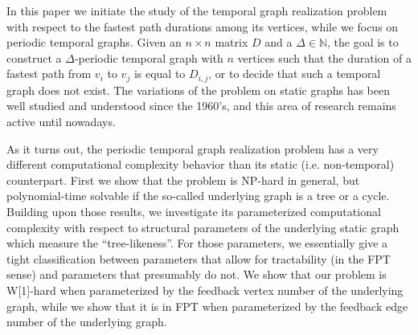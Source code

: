 In this paper we initiate the study of the temporal graph realization problem with respect to the fastest path durations among its vertices, while we focus on periodic temporal graphs. Given an $n \times n$ matrix $D$ and a $\Delta \in \mathbb{N}$, the goal is to construct a $\Delta$-periodic temporal graph with $n$ vertices such that the duration of a fastest path from $v_i$ to $v_j$ is equal to $D_{i,j}$, or to decide that such a temporal graph does not exist. The variations of the problem on static graphs has been well studied and understood since the 1960's, and this area of research remains active until nowadays. 

As it turns out, the periodic temporal graph realization problem has a very different computational complexity behavior than its static (i.e. non-temporal) counterpart. First we show that the problem is NP-hard in general, but polynomial-time solvable if the so-called underlying graph is a tree or a cycle. Building upon those results, we investigate its parameterized computational complexity with respect to structural parameters of the underlying static graph which measure the ``tree-likeness''. For those parameters, we essentially give a tight classification between parameters that allow for tractability (in the FPT sense) and parameters that presumably do not. We show that our problem is W[1]-hard when parameterized by the feedback vertex number of the underlying graph, while we show that it is in FPT when parameterized by the feedback edge number of the underlying graph. 